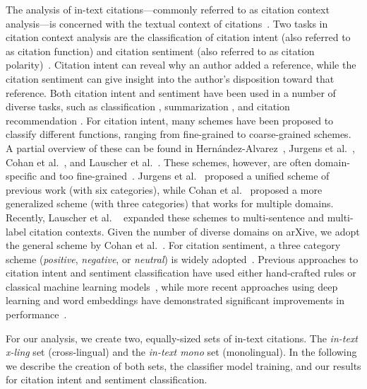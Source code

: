 The analysis of in-text citations---commonly referred to as citation context analysis---is concerned with the textual context of citations~\cite{Hernandez2016}. Two tasks in citation context analysis are the classification of citation intent (also referred to as citation function) and citation sentiment (also referred to as citation polarity)~\cite{Hernandez2016}. Citation intent can reveal why an author added a reference, while the citation sentiment can give insight into the author's disposition toward that reference. Both citation intent and sentiment have been used in a number of diverse tasks, such as classification \cite{Jurgens2018,Cohan2019,Beltagy2019}, summarization \cite{Cohan2015}, and citation recommendation \cite{Faerber2020a}. For citation intent, many schemes have been proposed to classify different functions, ranging from fine-grained to coarse-grained schemes. A partial overview of these can be found in Hernández-Alvarez~\cite{Hernandez2016}, Jurgens et al.~\cite{Jurgens2018}, Cohan et al.~\cite{Cohan2019}, and Lauscher et al.~\cite{multicite-lauscher-2021}. These schemes, however, are often domain-specific and too fine-grained~\cite{Cohan2019}. Jurgens et al.~\cite{Jurgens2018} proposed a unified scheme of previous work (with six categories), while Cohan et al.~\cite{Cohan2019} proposed a more generalized scheme (with three categories) that works for multiple domains. Recently, Lauscher et al. ~\cite{multicite-lauscher-2021} expanded these schemes to multi-sentence and multi-label citation contexts. Given the number of diverse domains on arXive, we adopt the general scheme by Cohan et al.~\cite{Cohan2019}. For citation sentiment, a three category scheme (\textit{positive}, \textit{negative}, or \textit{neutral}) is widely adopted~\cite{Athar2011,Abujbara2013,Hernandez2016}. Previous approaches to citation intent and sentiment classification have used either hand-crafted rules or classical machine learning models~\cite{Abujbara2013,Jurgens2018}, while more recent approaches using deep learning and word embeddings have demonstrated significant improvements in performance~\cite{Cohan2019,Beltagy2019,multicite-lauscher-2021}.

For our analysis, we create two, equally-sized sets of in-text citations. The \textit{in-text x-ling} set (cross-lingual) and the \textit{in-text mono} set (monolingual). In the following we describe the creation of both sets, the classifier model training, and our results for citation intent and sentiment classification.

